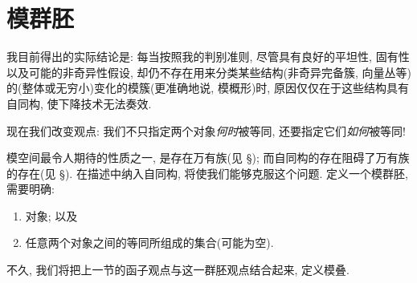 \section{模群胚}\label{src:1.4}
\begin{epigraph}
我目前得出的实际结论是: 每当按照我的判别准则, 尽管具有良好的平坦性, 固有性以及可能的非奇异性假设, 却仍不存在用来分类某些结构(非奇异完备簇, 向量丛等)的(整体或无穷小)变化的模簇(更准确地说, 模概形)时, 原因仅仅在于这些结构具有自同构, 使下降技术无法奏效.
\end{epigraph}
现在我们改变观点: 我们不只指定两个对象\textit{何时}被等同, 还要指定它们\textit{如何}被等同!

模空间最令人期待的性质之一, 是存在万有族(见 \S{}); 而自同构的存在阻碍了万有族的存在(见 \S{}). 在描述中纳入自同构, 将使我们能够克服这个问题. 定义一个模群胚, 需要明确: 
\begin{enumerate}[(1)]
\item 对象; 以及
\item 任意两个对象之间的等同所组成的集合(可能为空).
\end{enumerate}
不久, 我们将把上一节的函子观点与这一群胚观点结合起来, 定义模叠.

